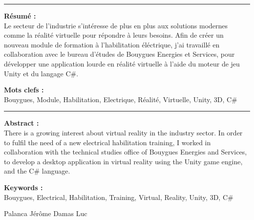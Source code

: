 \documentclass[a4paper]{article}
\begin{document}
    \vspace{10pt}
    \noindent\rule{0.725\paperwidth}{0.4pt}
    
    \vfill 
    \begin{flushleft}
    \huge \textbf{Résumé : } \\
    \vspace{10pt}
    \normalsize Le secteur de l'industrie s'intéresse de plus en plus aux solutions modernes comme la réalité virtuelle pour répondre à leurs besoins. Afin de créer un nouveau module de formation à l'habilitation éléctrique, j'ai travaillé en collaboration avec le bureau d'études de Bouygues Energies et Services, pour développer une application lourde en réalité virtuelle à l'aide du moteur de jeu Unity et du langage C\#. \\
    \end{flushleft}
    
    \vfill 
    \begin{flushleft}
    \huge \textbf{Mots clefs : } \vspace{2pt} \\
    \vspace{10pt}
    \normalsize Bouygues, Module, Habilitation, Electrique, Réalité, Virtuelle, Unity, 3D, C\#
    \end{flushleft}

    \noindent\rule{0.725\paperwidth}{0.4pt}
    
    \vfill 
    \begin{flushleft}
    \huge \textbf{Abstract : } \\
    \vspace{10pt}
    \normalsize There is a growing interest about virtual reality in the industry sector. In order to fulfil the need of a new electrical habilitation training, I worked in collaboration with the technical studies office of Bouygues Energies and Services, to develop a desktop application in virtual reality using the Unity game engine, and the C\# language.
    \end{flushleft}
    
    \vfill 
    \begin{flushleft}
    \huge \textbf{Keywords : } \\
    \vspace{10pt}
    \normalsize Bouygues, Electrical, Habilitation, Training, Virtual, Reality, Unity, 3D, C\#
    \end{flushleft}

	\vfill
    Palanca Jérôme \hfill Damas Luc
\end{document}
